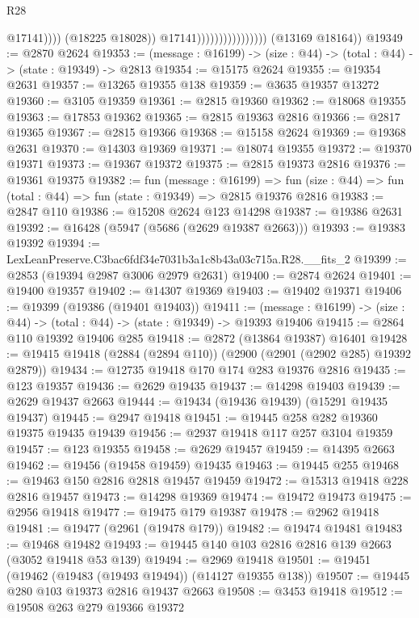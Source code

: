 \begin{lexlean}{R28}
\begin{coremodule}
                                                @17141))))
                                        (@18225 @18028))
                                      @17141))))))))))))))))
      (@13169 @18164))
@19349 := @2870 @2624
@19353 := (message : @16199) -> (size : @44) -> (total : @44) -> (state : @19349) -> @2813
@19354 := @15175 @2624
@19355 := @19354 @2631
@19357 := @13265 @19355 @138
@19359 := @3635 @19357 @13272
@19360 := @3105 @19359
@19361 := @2815 @19360
@19362 := @18068 @19355
@19363 := @17853 @19362
@19365 := @2815 @19363 @2816
@19366 := @2817 @19365
@19367 := @2815 @19366
@19368 := @15158 @2624
@19369 := @19368 @2631
@19370 := @14303 @19369
@19371 := @18074 @19355
@19372 := @19370 @19371
@19373 := @19367 @19372
@19375 := @2815 @19373 @2816
@19376 := @19361 @19375
@19382 := fun (message : @16199) =>
  fun (size : @44) => fun (total : @44) => fun (state : @19349) => @2815 @19376 @2816
@19383 := @2847 @110
@19386 := @15208 @2624 @123 @14298
@19387 := @19386 @2631
@19392 := @16428 (@5947 (@5686 (@2629 @19387 @2663)))
@19393 := @19383 @19392
@19394 := LexLeanPreserve.C3bac6fdf34e7031b3a1c8b43a03c715a.R28.__fits_2
@19399 := @2853 (@19394 @2987 @3006 @2979 @2631)
@19400 := @2874 @2624
@19401 := @19400 @19357
@19402 := @14307 @19369
@19403 := @19402 @19371
@19406 := @19399 (@19386 (@19401 @19403))
@19411 := (message : @16199) -> (size : @44) -> (total : @44) -> (state : @19349) -> @19393 @19406
@19415 := @2864 @110 @19392 @19406 @285
@19418 := @2872 (@13864 @19387) @16401
@19428 := @19415 @19418 (@2884 (@2894 @110)) (@2900 (@2901 (@2902 @285) @19392 @2879))
@19434 := @12735 @19418 @170 @174 @283 @19376 @2816
@19435 := @123 @19357
@19436 := @2629 @19435
@19437 := @14298 @19403
@19439 := @2629 @19437 @2663
@19444 := @19434 (@19436 @19439) (@15291 @19435 @19437)
@19445 := @2947 @19418
@19451 := @19445 @258 @282 @19360 @19375 @19435 @19439
@19456 := @2937 @19418 @117 @257 @3104 @19359
@19457 := @123 @19355
@19458 := @2629 @19457
@19459 := @14395 @2663
@19462 := @19456 (@19458 @19459) @19435
@19463 := @19445 @255
@19468 := @19463 @150 @2816 @2818 @19457 @19459
@19472 := @15313 @19418 @228 @2816 @19457
@19473 := @14298 @19369
@19474 := @19472 @19473
@19475 := @2956 @19418
@19477 := @19475 @179 @19387
@19478 := @2962 @19418
@19481 := @19477 (@2961 (@19478 @179))
@19482 := @19474 @19481
@19483 := @19468 @19482
@19493 := @19445 @140 @103 @2816 @2816 @139 @2663 (@3052 @19418 @53 @139)
@19494 := @2969 @19418
@19501 := @19451 (@19462 (@19483 (@19493 @19494)) (@14127 @19355 @138))
@19507 := @19445 @280 @103 @19373 @2816 @19437 @2663
@19508 := @3453 @19418
@19512 := @19508 @263 @279 @19366 @19372

\end{coremodule}
\end{lexlean}

